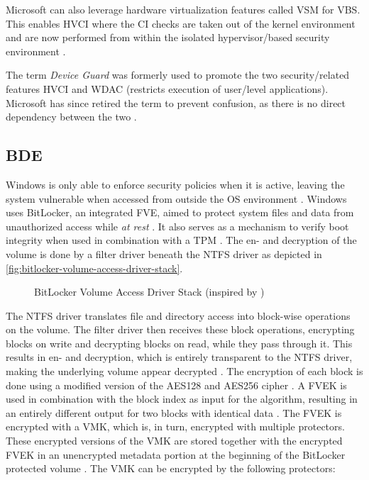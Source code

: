 Microsoft can also leverage hardware virtualization features called \ac{VSM} for \ac{VBS}.
This enables \ac{HVCI} where the \ac{CI} checks are taken out of the kernel environment and are now performed from within the isolated hypervisor\-/based security environment \cite{micosoft-windows-oem-vbs}.

The term \emph{Device Guard} was formerly used to promote the two security\-/related features \ac{HVCI} and \ac{WDAC} (restricts execution of user\-/level applications).
Microsoft has since retired the term to prevent confusion, as there is no direct dependency between the two \cite{microsoft-windows-no-longer-device-guard}.

\subsection{\acf{BDE}}
\label{sec:windows:security:bde}

Windows is only able to enforce security policies when it is active, leaving the system vulnerable when accessed from outside the \ac{OS} environment \cite[Section 9]{windows-internals-6-part2}.
Windows uses BitLocker, an integrated \ac{FVE}, aimed to protect system files and data from unauthorized access while \emph{at rest} \cite{microsoft-bitlocker-overview}.
It also serves as a mechanism to verify boot integrity when used in combination with a \ac{TPM} \cite[Section 9]{windows-internals-6-part2}.
The en- and decryption of the volume is done by a filter driver beneath the \ac{NTFS} driver as depicted in \autoref{fig:bitlocker-volume-access-driver-stack}.

\begin{figure}[htb]%
    \centering
    
    \caption[BitLocker Volume Access Driver Stack]{BitLocker Volume Access Driver Stack (inspired by \cite[Figure 9-24]{windows-internals-6-part2})}%
    \label{fig:bitlocker-volume-access-driver-stack}%
\end{figure}

The \ac{NTFS} driver translates file and directory access into block-wise operations on the volume.
The filter driver then receives these block operations, encrypting blocks on write and decrypting blocks on read, while they pass through it.
This results in en- and decryption, which is entirely transparent to the \ac{NTFS} driver, making the underlying volume appear decrypted \cite[Section 9]{windows-internals-6-part2}.
The encryption of each block is done using a modified version of the \ac{AES}128 and \ac{AES}256 cipher \cite[Section 9]{windows-internals-6-part2}.
A \ac{FVEK} is used in combination with the block index as input for the algorithm, resulting in an entirely different output for two blocks with identical data \cite[Section 9]{windows-internals-6-part2}.
The \ac{FVEK} is encrypted with a \ac{VMK}, which is, in turn, encrypted with multiple protectors.
These encrypted versions of the \ac{VMK} are stored together with the encrypted \ac{FVEK} in an unencrypted metadata portion at the beginning of the BitLocker protected volume \cite[Section 9]{windows-internals-6-part2}.
The \ac{VMK} can be encrypted by the following protectors:

